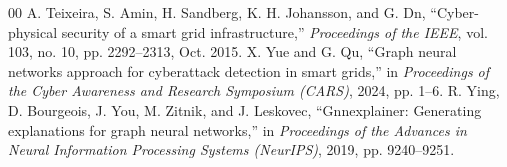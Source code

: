 \documentclass[conference]{IEEEtran}
\begin{document}
\begin{thebibliography}{00}
 A. Teixeira, S. Amin, H. Sandberg, K. H. Johansson, and G. Dn, ``Cyber-physical security of a smart grid infrastructure,'' \emph{Proceedings of the IEEE}, vol. 103, no. 10, pp. 2292--2313, Oct. 2015.
 X. Yue and G. Qu, ``Graph neural networks approach for cyberattack detection in smart grids,'' in \emph{Proceedings of the Cyber Awareness and Research Symposium (CARS)}, 2024, pp. 1--6.
 R. Ying, D. Bourgeois, J. You, M. Zitnik, and J. Leskovec, ``Gnnexplainer: Generating explanations for graph neural networks,'' in \emph{Proceedings of the Advances in Neural Information Processing Systems (NeurIPS)}, 2019, pp. 9240--9251.
\end{thebibliography}
\end{document}
